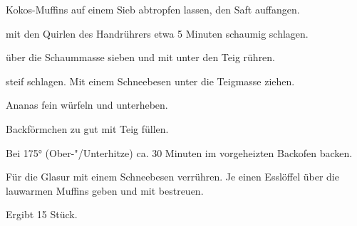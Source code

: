 \begin{recipe}{Kokos-Muffins}
  auf einem Sieb abtropfen lassen, den Saft auffangen.

  mit den Quirlen des Handrührers etwa 5 Minuten schaumig schlagen.

  über die Schaummasse sieben und mit
  unter den Teig rühren.

  steif schlagen. Mit einem Schneebesen unter die Teigmasse ziehen.

  Ananas fein würfeln und unterheben.

  Backförmchen zu gut  mit Teig füllen.

  Bei 175° (Ober-"/Unterhitze) ca. 30 Minuten im vorgeheizten
  Backofen backen.

  Für die Glasur
  mit einem Schneebesen verrühren. Je einen Esslöffel über die lauwarmen
  Muffins geben und mit
  bestreuen.

  Ergibt 15 Stück.
\end{recipe}

